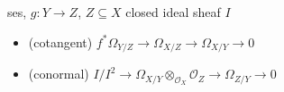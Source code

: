 \begin{proposition} ses, $g : Y \to Z$, $Z \subseteq X$ closed ideal sheaf $I$
\begin{itemize}[topsep=-6pt, itemsep=0pt]
    \item (cotangent) $f^* \Omega_{Y/Z} \to \Omega_{X/Z} \to \Omega_{X/Y} \to 0$
    \item (conormal) $I/I^2 \to \Omega_{X/Y} \otimes_{\mathcal{O}_X} \mathcal{O}_Z \to \Omega_{Z/Y} \to 0$
\end{itemize}
\end{proposition}


